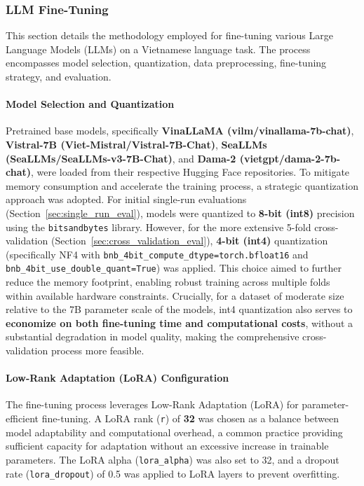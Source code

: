 \documentclass[conference]{IEEEtran}
\begin{document}
\subsubsection{LLM Fine-Tuning}
\label{sec:LLM Fine-Tuning}

This section details the methodology employed for fine-tuning various Large Language Models (LLMs) on a Vietnamese language task. The process encompasses model selection, quantization, data preprocessing, fine-tuning strategy, and evaluation.

\paragraph{Model Selection and Quantization}
Pretrained base models, specifically \textbf{VinaLLaMA (vilm/vinallama-7b-chat)}, \textbf{Vistral-7B (Viet-Mistral/Vistral-7B-Chat)}, \textbf{SeaLLMs (SeaLLMs/SeaLLMs-v3-7B-Chat)}, and \textbf{Dama-2 (vietgpt/dama-2-7b-chat)}, were loaded from their respective Hugging Face repositories. To mitigate memory consumption and accelerate the training process, a strategic quantization approach was adopted. For initial single-run evaluations (Section~\ref{sec:single_run_eval}), models were quantized to \textbf{8-bit (int8)} precision using the \texttt{bitsandbytes} library. However, for the more extensive 5-fold cross-validation (Section~\ref{sec:cross_validation_eval}), \textbf{4-bit (int4)} quantization (specifically NF4 with \texttt{bnb\_4bit\_compute\_dtype=torch.bfloat16} and \texttt{bnb\_4bit\_use\_double\_quant=True}) was applied. This choice aimed to further reduce the memory footprint, enabling robust training across multiple folds within available hardware constraints. Crucially, for a dataset of moderate size relative to the 7B parameter scale of the models, int4 quantization also serves to \textbf{economize on both fine-tuning time and computational costs}, without a substantial degradation in model quality, making the comprehensive cross-validation process more feasible.

\paragraph{Low-Rank Adaptation (LoRA) Configuration}
The fine-tuning process leverages Low-Rank Adaptation (LoRA) \cite{hu2021lora} for parameter-efficient fine-tuning. A LoRA rank (\texttt{r}) of \textbf{32} was chosen as a balance between model adaptability and computational overhead, a common practice providing sufficient capacity for adaptation without an excessive increase in trainable parameters. The LoRA alpha (\texttt{lora\_alpha}) was also set to 32, and a dropout rate (\texttt{lora\_dropout}) of 0.5 was applied to LoRA layers to prevent overfitting.
\end{document}
